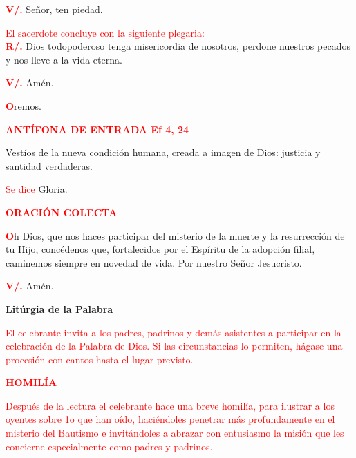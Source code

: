 \documentclass[12pt, letterpaper, spanish]{article}
\begin{document}
  \noindent
  {\bfseries \textcolor{red}{V/.}} \hspace{1cm} Se\~nor, ten piedad. 

  \large {\textcolor{red}{El sacerdote concluye con la siguiente plegaria:}}\\
  \Large {\bfseries \textcolor{red}{R/.}} \hspace{1cm} Dios todopoderoso tenga misericordia de nosotros, perdone nuestros pecados y nos lleve a la vida eterna.

  \noindent
  \Large {\bfseries \textcolor{red}{V/.}} \hspace{1cm} Am\'en.

  \noindent
  \lettrine[lines=1]{\bfseries \textcolor{red}{O}}{}\Large {remos.}

  \large {\bfseries \textcolor{red}{ANT\'IFONA DE ENTRADA Ef 4, 24}}

  \noindent
  \Large {Vestíos de la nueva condición humana, creada a imagen de Dios: justicia y santidad verdaderas.}

  \large {\textcolor{red}{Se dice} Gloria.}

  \large {\bfseries \textcolor{red}{ORACI\'ON COLECTA}}

  \lettrine[lines=2]{\bfseries \textcolor{red}{O}}{}\Large {h Dios, que nos haces participar del misterio de la muerte y la resurrección de tu Hijo, concédenos que, fortalecidos por el Espíritu de la adopción filial, caminemos siempre en novedad de vida. Por nuestro Señor Jesucristo.}

  \noindent
  \Large {\bfseries \textcolor{red}{V/.}} \hspace{1cm} Am\'en.

  \clearpage

  \begin{center}
    \Huge {\bfseries Lit\'urgia de la Palabra}
  \end{center}

  \large {\textcolor{red}{El celebrante invita a los padres, padrinos y dem\'as asistentes a participar en la celebraci\'on de la Palabra de Dios. Si las circunstancias lo permiten, h\'agase una procesi\'on con cantos hasta el lugar previsto.}} 

  \Large {\bfseries \textcolor{red}{HOMIL\'IA}} 

  \large {\textcolor{red}{Despu\'es de la lectura el celebrante hace una breve homil\'ia, para ilustrar a los oyentes sobre 1o que han o\'ido, haci\'endoles penetrar m\'as profundamente en el misterio del Bautismo e invit\'andoles a abrazar con entusiasmo la misi\'on que les concierne especialmente como padres y padrinos.}}
\end{document}

